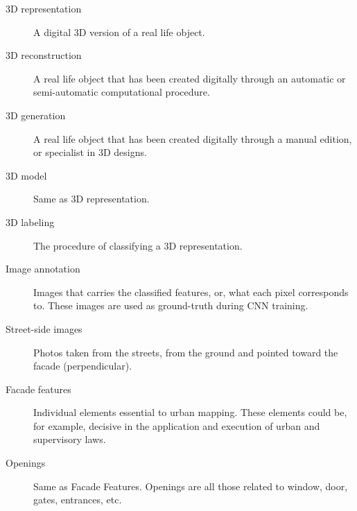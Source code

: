 \begin{glossario}
    \begin{description}
    \item [3D representation] A digital 3D version of a real life object.
    \item [3D reconstruction] A real life object that has been created digitally through an automatic or semi-automatic computational procedure.
    \item [3D generation] A real life object that has been created digitally through a manual edition, or specialist in 3D designs.
    \item [3D model] Same as 3D representation.
    \item [3D labeling] The procedure of classifying a 3D representation.
    \item [Image annotation] Images that carries the classified features, or, what each pixel corresponds to. These images are used as ground-truth during CNN training.
    \item [Street-side images] Photos taken from the streets, from the ground and pointed toward the facade (perpendicular).
    \item [Facade features] Individual elements essential to urban mapping. These elements could be, for example, decisive in the application and execution of urban and supervisory laws.
    \item [Openings] Same as Facade Features. Openings are all those related to window, door, gates, entrances, etc.
    \end{description}
\end{glossario}
